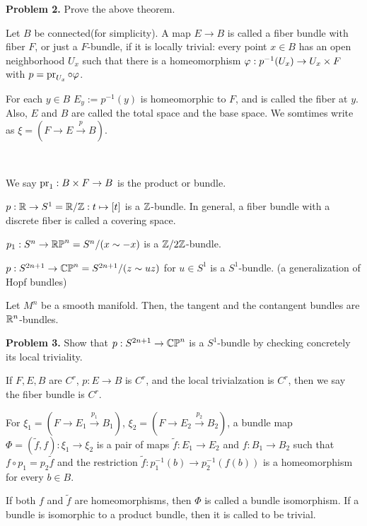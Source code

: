 \documentclass{../../../small}
\begin{document}
\textbf{Problem 2.} Prove the above theorem.

\begin{defn}
Let $B$ be connected(for simplicity).
A map $E\to B$ is called a fiber bundle with fiber $F$, or just a $F$-bundle, if it is locally trivial: every point $x\in B$ has an open neighborhood $U_x$ such that there is a homeomorphism $\varphi:p^{-1}(U_x)\to U_x\times F$ with $p=\operatorname{pr}_{U_x}\circ\varphi$.

For each $y\in B$ $E_y:=p^{-1}(y)$ is homeomorphic to $F$, and is called the fiber at $y$.
Also, $E$ and $B$ are called the total space and the base space.
We somtimes write as $\xi=(F\to E\xrightarrow{p}B)$.
\end{defn}
\begin{ex*}\,
\begin{parts}
\item We say $\operatorname{pr}_1:B\times F\to B$ is the product or bundle.
\item $p:\mathbb{R}\to S^1=\mathbb{R}/\mathbb{Z}:t\mapsto[t]$ is a $\mathbb{Z}$-bundle. In general, a fiber bundle with a discrete fiber is called a covering space.
\item $p_1:S^n\to\mathbb{RP}^n=S^n/(x\sim-x)$ is a $\mathbb{Z}/2\mathbb{Z}$-bundle.
\item $p:S^{2n+1}\to\mathbb{CP}^n=S^{2n+1}/(z\sim uz)$ for $u\in S^1$ is a $S^1$-bundle. (a generalization of Hopf bundles)
\item Let $M^n$ be a smooth manifold. Then, the tangent and the contangent bundles are $\mathbb{R}^n$-bundles.
\end{parts}
\end{ex*}

\textbf{Problem 3.} Show that $p:S^{2n+1}\to\mathbb{CP}^n$ is a $S^1$-bundle by checking concretely its local triviality.

\begin{defn}
If $F,E,B$ are $C^r$, $p:E\to B$ is $C^r$, and the local trivialzation is $C^r$, then we say the fiber bundle is $C^r$.
\end{defn}
\begin{defn}
For $\xi_1=(F\to E_1\xrightarrow{p_1}B_1)$, $\xi_2=(F\to E_2\xrightarrow{p_2}B_2)$, a bundle map $\Phi=(\tilde f,f):\xi_1\to\xi_2$ is a pair of maps $\tilde f:E_1\to E_2$ and $f:B_1\to B_2$ such that $f\circ p_1=p_2\tilde f$ and the restriction $\tilde f:p_1^{-1}(b)\to p_2^{-1}(f(b))$ is a homeomorphism for every $b\in B$.

If both $f$ and $\tilde f$ are homeomorphisms, then $\Phi$ is called a bundle isomorphism.
If a bundle is isomorphic to a product bundle, then it is called to be trivial.
\end{defn}
\end{document}
